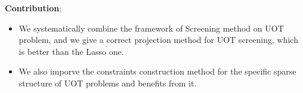 \textbf{Contribution}: 
\begin{itemize}
\item We systematically combine the framework of Screening method on UOT problem, and we give a correct projection method for UOT screening, which is better than the Lasso one. 
\item We also imporve the constraints construction method for the specific sparse structure of UOT problems and benefits from it.
\end{itemize}



